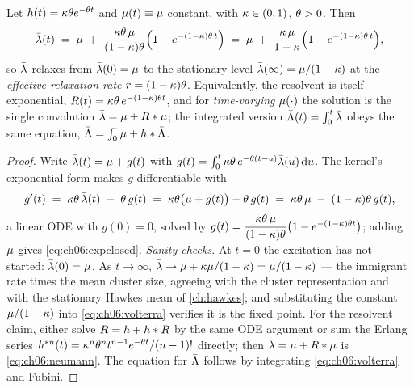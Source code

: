 \begin{proposition}\label{prop:ch06:expclosed}
Let $h(t) = \kappa\theta e^{-\theta t}$ and $\mu(t)\equiv\mu$
constant, with $\kappa\in(0,1)$, $\theta>0$. Then
\begin{equation}\label{eq:ch06:expclosed}
\bar{\lambda}(t)
 \;=\;
 \mu \;+\; \frac{\kappa\theta\,\mu}{(1-\kappa)\theta}
 \Big(1 - e^{-(1-\kappa)\theta\, t}\Big)
 \;=\;
 \mu \;+\; \frac{\kappa\,\mu}{1-\kappa}
 \Big(1 - e^{-(1-\kappa)\theta\, t}\Big),
\end{equation}
so $\bar{\lambda}$ relaxes from $\bar{\lambda}(0)=\mu$ to the stationary level
$\bar{\lambda}(\infty) = \mu/(1-\kappa)$ at the \emph{effective relaxation
rate} $r = (1-\kappa)\theta$. Equivalently, the resolvent is itself
exponential, $R(t) = \kappa\theta\, e^{-(1-\kappa)\theta t}$, and for
\emph{time-varying} $\mu(\cdot)$ the solution is the single convolution
$\bar{\lambda} = \mu + R*\mu$; the integrated version
$\bar{\Lambda}(t) = \int_0^t \bar{\lambda}$ obeys the same equation,
$\bar{\Lambda} = \int_0^\cdot \mu + h * \bar{\Lambda}$.
\end{proposition}

\begin{proof}
Write $\bar{\lambda}(t) = \mu + g(t)$ with
$g(t) = \int_0^t \kappa\theta\, e^{-\theta(t-u)}\bar{\lambda}(u)\,\mathrm{d} u$. The
kernel's exponential form makes $g$ differentiable with
\[
g'(t) \;=\; \kappa\theta\,\bar{\lambda}(t) \;-\; \theta\, g(t)
 \;=\; \kappa\theta\big(\mu + g(t)\big) - \theta\, g(t)
 \;=\; \kappa\theta\,\mu \;-\; (1-\kappa)\theta\, g(t),
\]
a linear ODE with $g(0)=0$, solved by
$g(t) = \dfrac{\kappa\theta\,\mu}{(1-\kappa)\theta}
\big(1 - e^{-(1-\kappa)\theta t}\big)$; adding $\mu$ gives
\cref{eq:ch06:expclosed}. \emph{Sanity checks.} At $t=0$ the excitation has
not started: $\bar{\lambda}(0)=\mu$. As $t\to\infty$,
$\bar{\lambda} \to \mu + \kappa\mu/(1-\kappa) = \mu/(1-\kappa)$ --- the
immigrant rate times the mean cluster size, agreeing with the cluster
representation and with the stationary Hawkes mean of \cref{ch:hawkes};
and substituting the constant $\mu/(1-\kappa)$ into
\cref{eq:ch06:volterra} verifies it is the fixed point. For the resolvent
claim, either solve $R = h + h * R$ by the same ODE argument or
sum the Erlang series
$h^{*n}(t) = \kappa^n \theta^n t^{n-1}e^{-\theta t}/(n-1)!$
directly; then $\bar{\lambda} = \mu + R*\mu$ is
\cref{eq:ch06:neumann}. The equation for $\bar{\Lambda}$ follows by integrating
\cref{eq:ch06:volterra} and Fubini.
\end{proof}

